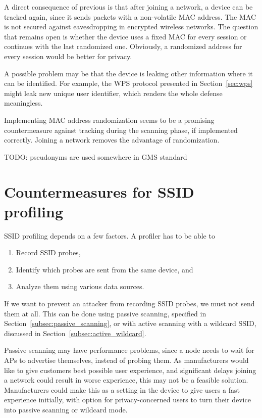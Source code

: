 \documentclass[12pt,a4paper,oneside,pdftex]{report}
\begin{document}
A direct consequence of previous is that after joining a network, a device can be tracked again, since it sends packets with a non-volatile MAC address. The MAC is not secured against eavesdropping in encrypted wireless networks. The question that remains open is whether the device uses a fixed MAC for every session or continues with the last randomized one. Obviously, a randomized address for every session would be better for privacy.

A possible problem may be that the device is leaking other information where it can be identified. For example, the WPS protocol presented in Section~\ref{sec:wps} might leak new unique user identifier, which renders the whole defense meaningless.

Implementing MAC address randomization seems to be a promising countermeasure against tracking during the scanning phase, if implemented correctly. Joining a network removes the advantage of randomization.

TODO: pseudonyms are used somewhere in GMS standard

\section{Countermeasures for SSID profiling}
\label{sec:countermeasures_ssid}

SSID profiling depends on a few factors. A profiler has to be able to \begin{enumerate}
    \item Record SSID probes,
    \item Identify which probes are sent from the same device, and
    \item Analyze them using various data sources.
\end{enumerate}

If we want to prevent an attacker from recording SSID probes, we must not send them at all. This can be done using passive scanning, specified in Section~\ref{subsec:passive_scanning}, or with active scanning with a wildcard SSID, discussed in Section~\ref{subsec:active_wildcard}.

Passive scanning may have performance problems, since a node needs to wait for APs to advertise themselves, instead of probing them. As manufacturers would like to give customers best possible user experience, and significant delays joining a network could result in worse experience, this may not be a feasible solution. Manufacturers could make this as a setting in the device to give users a fast experience initially, with option for privacy-concerned users to turn their device into passive scanning or wildcard mode.
\end{document}
